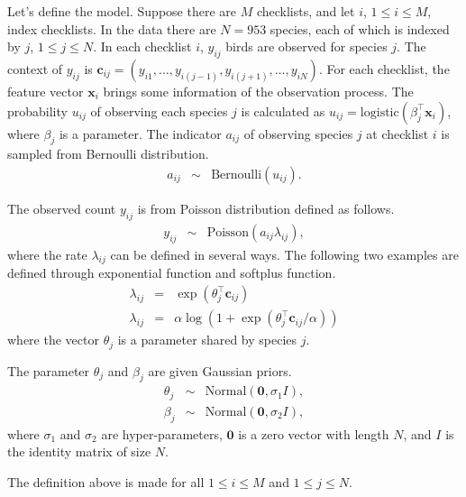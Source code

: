 \documentclass{article}
\begin{document}
Let's define the model. Suppose there are $M$ checklists, and let $i$, $1 \le i \le M$, index checklists. In the data there are $N = 953$ species, each of which is indexed by $j$, $1 \le j \le N$.  
In each checklist $i$, $y_{ij}$ birds are observed for species $j$. The context of $y_{ij}$ is $\mathbf{c}_{ij} = (y_{i1}, \ldots, y_{i(j-1)}, y_{i(j+1)}, \ldots, y_{iN})$. For each checklist, the feature vector $\mathbf{x}_{i}$ brings some information of the observation process. The probability $u_{ij}$ of observing each species $j$ is calculated as $u_{ij} = \mathrm{logistic}(\beta_j^\top \mathbf{x}_i)$, where $\beta_j$ is a parameter. The indicator $a_{ij}$ of observing species $j$ at checklist $i$ is sampled from Bernoulli distribution. 
\begin{eqnarray}
a_{ij} &\sim& \mathrm{Bernoulli}(u_{ij}).
\end{eqnarray}

The observed count $y_{ij}$ is from Poisson distribution defined as follows.   
\begin{eqnarray}
y_{ij} &\sim& \mathrm{Poisson}(a_{ij} \lambda_{ij}),
\end{eqnarray}
where the rate $\lambda_{ij}$ can be defined in several ways. The following two examples are defined through exponential function and softplus function. 
\begin{eqnarray}
\lambda_{ij} &=& \exp(\theta_{j}^\top \mathbf{c}_{ij} ) \label{lambda_exp} \\
\lambda_{ij} &=& \alpha \log (1 + \exp(\theta_{j}^\top \mathbf{c}_{ij} / \alpha)) \label{lambda_sp}
\end{eqnarray}
where the vector $\theta_j$ is a parameter shared by species $j$. 

The parameter $\theta_j$ and $\beta_j$ are given Gaussian priors. 
\begin{eqnarray}
\theta_j &\sim& \mathrm{Normal}(\mathbf{0}, \sigma_1 I), \\
\beta_j &\sim& \mathrm{Normal}(\mathbf{0}, \sigma_2 I),
\end{eqnarray}
where $\sigma_1$ and $\sigma_2$ are hyper-parameters, $\mathbf{0}$ is a zero vector with length $N$, and $I$ is the identity matrix of size $N$. 


The definition above is made for all $1 \le i \le M$ and $1 \le j \le N$. 
\end{document}
